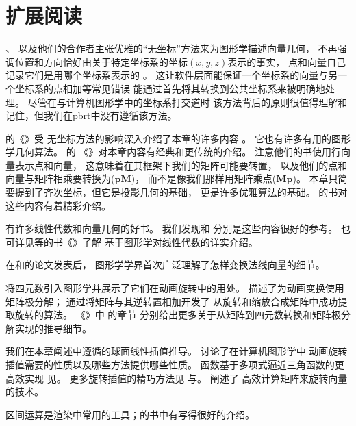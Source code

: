 \section{扩展阅读}\label{sec:扩展阅读02}
\citeauthor{10.1007/978-3-642-61542-9_19}、\citeauthor{10.1145/282957.282969}
以及他们的合作者主张优雅的“无坐标”方法来为图形学描述向量几何，
不再强调位置和方向恰好由关于特定坐标系的坐标$(x,y,z)$表示的事实，
点和向量自己记录它们是用哪个坐标系表示的
\citep{10.1145/282957.282969,10.1007/978-3-642-61542-9_19,Mann97acoordinate}。
这让软件层面能保证一个坐标系的向量与另一个坐标系的点相加等常见错误
能通过首先将其转换到公共坐标系来被明确地处理。
尽管在与计算机图形学中的坐标系打交道时
该方法背后的原则很值得理解和记住，但我们在pbrt中没有遵循该方法。

\citet{10.5555/2821579}的《》受
无坐标方法的影响深入介绍了本章的许多内容
。
它也有许多有用的图形学几何算法。
\citet{10.5555/63448}的
《》对本章内容有经典和更传统的介绍。
注意他们的书使用行向量表示点和向量，
这意味着在其框架下我们的矩阵可能要转置，
以及他们的点和向量与矩阵相乘要转换为($\bm p\bm M$)，
而不是像我们那样用矩阵乘点($\bm M\bm p$)。
本章只简要提到了齐次坐标，但它是投影几何的基础，
更是许多优雅算法的基础。
\citet{10.5555/113163}的书对这些内容有着精彩介绍。

有许多线性代数和向量几何的好书。
我们发现\citet{lang2012introduction}和\citet{buck1956advanced}
分别是这些内容很好的参考。
也可详见\citet{10.5555/2829183}等的书《》了解
基于图形学对线性代数的详实介绍。

在\citet{inproceedings}和\citet{TURKOWSKI1990539}的论文发表后，
图形学学界首次广泛理解了怎样变换法线向量的细节。

\citet{10.1145/325334.325242}将四元数引入图形学并展示了它们在动画旋转中的用处。
\citet{10.5555/155294.155324}描述了为动画变换使用矩阵极分解；
\citet{doi:10.1137/0907079}通过将矩阵与其逆转置相加开发了
从旋转和缩放合成矩阵中成功提取旋转的算法。
《\emph{}》中
\citet{SHOEMAKE1991351,SHOEMAKE1994207,10.5555/180895.180914}的章节
分别给出更多关于从矩阵到四元数转换和矩阵极分解实现的推导细节。

我们在本章阐述中遵循\citet{Blow_2004}的球面线性插值推导。
\citet{Bloom2003ErrorsAO}讨论了在计算机图形学中
动画旋转插值需要的性质以及哪些方法提供哪些性质。
函数基于多项式逼近三角函数的更高效实现
见\citet{doi:10.1080/2151237X.2011.610255}。
更多旋转插值的精巧方法见\citet{10.1145/258734.258870}
与\citet{10.1145/502122.502124}。
\citet{doi:10.1080/10867651.1999.10487509}阐述了
高效计算矩阵来旋转向量的技术。

区间运算是渲染中常用的工具；\citet{moore1966interval}的书中有写得很好的介绍。